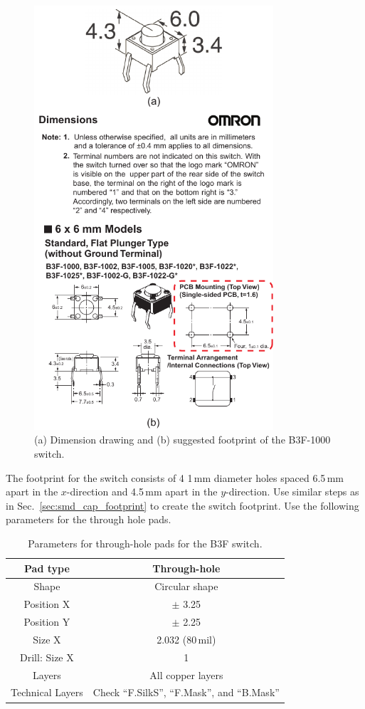 \documentclass[12pt,letterpaper]{scrartcl}
\begin{document}
	\begin{figure}[hp]
		\centering
		\includegraphics[width=3.5in]{b3f-datasheet}
		\caption{(a) Dimension drawing and (b) suggested footprint of the B3F-1000 switch.}
		\label{b3f-datasheet}
	\end{figure}

The footprint for the switch consists of 4 1\,mm diameter holes spaced 6.5\,mm apart in the $x$-direction and 4.5\,mm apart in the $y$-direction. Use similar steps as in Sec.~\ref{sec:smd_cap_footprint} to create the switch footprint. Use the following parameters for the through hole pads. 
			\begin{table}[hp]
				\centering
				\caption{Parameters for through-hole pads for the B3F switch.}
				\renewcommand{\arraystretch}{1.2}
				\small
				\begin{tabular}{|c|c|}
					\hline  Pad type & Through-hole \\ 
					\hline  Shape & Circular shape \\ 
					\hline  Position X & $\pm$ 3.25 \\ 
					\hline  Position Y & $\pm$ 2.25  \\ 
					\hline  Size X & 2.032 (80\,mil) \\ 
					\hline Drill: Size X & 1 \\					 
					\hline  Layers & All copper layers \\ 
					\hline  Technical Layers & Check ``F.SilkS'', ``F.Mask'',  and ``B.Mask''  \\ 
					\hline 
				\end{tabular} 
			\end{table}
			
\end{document}
